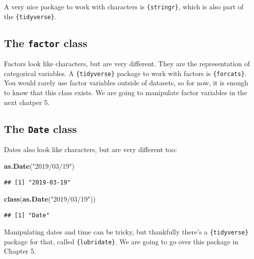 \documentclass[]{gitbook}
\newenvironment{Shaded}{\begin{snugshade}}{\end{snugshade}}
\newcommand{\KeywordTok}[1]{\textcolor[rgb]{0.13,0.29,0.53}{\textbf{#1}}}
\newcommand{\NormalTok}[1]{#1}
\newcommand{\StringTok}[1]{\textcolor[rgb]{0.31,0.60,0.02}{#1}}
\theoremstyle{definition}
\theoremstyle{definition}
\theoremstyle{definition}
\theoremstyle{remark}
\begin{document}
A very nice package to work with characters is \texttt{\{stringr\}},
which is also part of the \texttt{\{tidyverse\}}.

\hypertarget{the-factor-class}{%
\subsection{\texorpdfstring{The \texttt{factor}
class}{The factor class}}\label{the-factor-class}}

Factors look like characters, but are very different. They are the
representation of categorical variables. A \texttt{\{tidyverse\}}
package to work with factors is \texttt{\{forcats\}}. You would rarely
use factor variables outside of datasets, so for now, it is enough to
know that this class exists. We are going to manipulate factor variables
in the next chatper 5.

\hypertarget{the-date-class}{%
\subsection{\texorpdfstring{The \texttt{Date}
class}{The Date class}}\label{the-date-class}}

Dates also look like characters, but are very different too:

\begin{Shaded}
\begin{Highlighting}[]
\KeywordTok{as.Date}\NormalTok{(}\StringTok{"2019/03/19"}\NormalTok{)}
\end{Highlighting}
\end{Shaded}

\begin{verbatim}
## [1] "2019-03-19"
\end{verbatim}

\begin{Shaded}
\begin{Highlighting}[]
\KeywordTok{class}\NormalTok{(}\KeywordTok{as.Date}\NormalTok{(}\StringTok{"2019/03/19"}\NormalTok{))}
\end{Highlighting}
\end{Shaded}

\begin{verbatim}
## [1] "Date"
\end{verbatim}

Manipulating dates and time can be tricky, but thankfully there's a
\texttt{\{tidyverse\}} package for that, called \texttt{\{lubridate\}}.
We are going to go over this package in Chapter 5.
\end{document}
